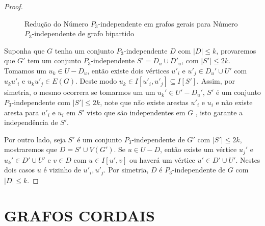 \documentclass[a4paper,8pt]{article}
\theoremstyle{plain}
\begin{document}
\begin{proof}
\begin{figure}[h]

    \caption{Redução do {\sc Número $P_3$-independente} em grafos gerais para {\sc Número $P_3$-independente} de grafo bipartido}
    \label{fig:split}
\end{figure}
Suponha que  $G$ tenha um conjunto $P_3$-independente $D$ com $|D|\leq k$, provaremos que $G'$ tem um conjunto $P_3$-independente $S'=D_u\cup D'_u$, com $|S'|\leq 2k$. Tomamos um $u_k\in U-D_u$, então existe dois vértices $u'_i$ e $u'_j\in D_u'\cup U'$ com $u_ku'_i$ e $ u_ku'_j \in E(G)$. Deste modo $u_k\in I[u'_i,u'_j]\subseteq I[S']$. Assim, por simetria, o mesmo ocorrera se tomarmos um um $u_k'\in U'-D_u'$, $S'$ é um conjunto $P_3$-independente com $|S'|\leq 2k$, note que não existe arestas $u'_i$ e $u_i$ e não existe aresta para $u'_i$ e $u_i$ em $S'$ visto que são independentes em $G$ , isto  garante a independência de $S'$. 

Por outro lado, seja $S'$ é um conjunto $P_3$-independente de $G'$ com 
$|S'|\leq 2k$, mostraremos que $D=S'\cup V(G')$. Se $u\in U-D$, então existe um vértice $u_j'$ e $u_k'\in D'\cup U'$ e $v\in D$ com $u \in I[u',v]$ ou haverá um vértice $u'\in D'\cup U'$. Nestes dois casos $u$ é vizinho de $u'_i,u'_j$. Por simetria, $D$ é $P_3$-independente de $G$ com $|D|\leq k$.
\end{proof}










\newpage

\section{GRAFOS CORDAIS}
\end{document}
